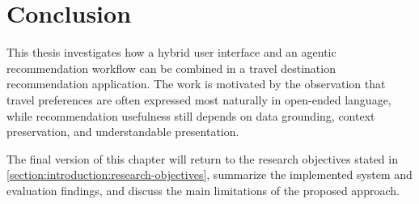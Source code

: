 
\chapter{Conclusion}\label{chapter:conclusion}

This thesis investigates how a hybrid user interface and an agentic recommendation workflow can be combined in a travel destination recommendation application. The work is motivated by the observation that travel preferences are often expressed most naturally in open-ended language, while recommendation usefulness still depends on data grounding, context preservation, and understandable presentation.

The final version of this chapter will return to the research objectives stated in \autoref{section:introduction:research-objectives}, summarize the implemented system and evaluation findings, and discuss the main limitations of the proposed approach.

